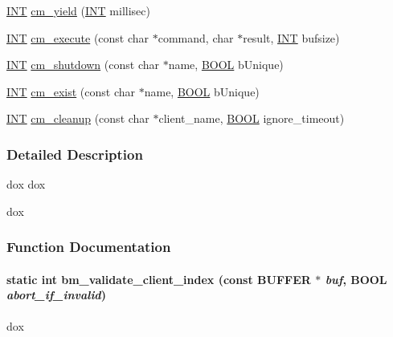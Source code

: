 \begin{DoxyCompactItemize}
\item 
\hyperlink{vppg_8h_a392e62da233ed3e2f7c3fd4f487a3896}{INT} \hyperlink{group__cmfunctionc_ga115565c5a1d9591fcabf844c1dd624f8}{cm\_\-yield} (\hyperlink{vppg_8h_a392e62da233ed3e2f7c3fd4f487a3896}{INT} millisec)
\item 
\hyperlink{vppg_8h_a392e62da233ed3e2f7c3fd4f487a3896}{INT} \hyperlink{group__cmfunctionc_ga609631cf55247d2e58069bae08419a86}{cm\_\-execute} (const char $\ast$command, char $\ast$result, \hyperlink{vppg_8h_a392e62da233ed3e2f7c3fd4f487a3896}{INT} bufsize)
\item 
\hyperlink{vppg_8h_a392e62da233ed3e2f7c3fd4f487a3896}{INT} \hyperlink{group__cmfunctionc_ga01682993f1aa1d5a4ed22de45ecf45fe}{cm\_\-shutdown} (const char $\ast$name, \hyperlink{vt2_8h_a239c7f0d40651c3e419c5b9651507d14}{BOOL} bUnique)
\item 
\hyperlink{vppg_8h_a392e62da233ed3e2f7c3fd4f487a3896}{INT} \hyperlink{group__cmfunctionc_gafb034d850f13190ba256f235fcea5298}{cm\_\-exist} (const char $\ast$name, \hyperlink{vt2_8h_a239c7f0d40651c3e419c5b9651507d14}{BOOL} bUnique)
\item 
\hyperlink{vppg_8h_a392e62da233ed3e2f7c3fd4f487a3896}{INT} \hyperlink{group__cmfunctionc_ga6208deae04212a3f234d80fe3185f86d}{cm\_\-cleanup} (const char $\ast$client\_\-name, \hyperlink{vt2_8h_a239c7f0d40651c3e419c5b9651507d14}{BOOL} ignore\_\-timeout)
\end{DoxyCompactItemize}


\subsubsection{Detailed Description}
dox dox

dox 

\subsubsection{Function Documentation}
\paragraph[{bm\_\-validate\_\-client\_\-index}]{\setlength{\rightskip}{0pt plus 5cm}static int bm\_\-validate\_\-client\_\-index (const {\bf BUFFER} $\ast$ {\em buf}, \/  {\bf BOOL} {\em abort\_\-if\_\-invalid})}\hfill\label{group__cmfunctionc_gab85c5c492c0ebadafe7b08fde9a4e946}
dox 

